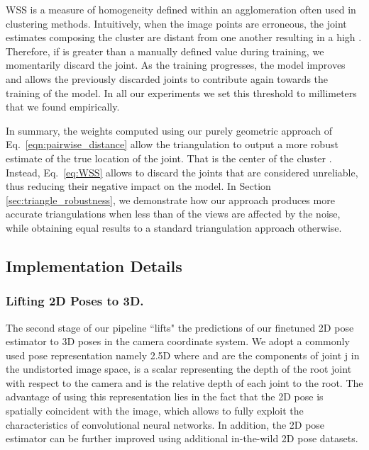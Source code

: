 \documentclass[runningheads]{llncs}
\begin{document}
WSS is a measure of homogeneity defined within an agglomeration often used in clustering methods. Intuitively, when the image points are erroneous, the joint estimates composing the cluster  are distant from one another resulting in a high . Therefore, if  is greater than a manually defined value during training, we momentarily discard the joint. As the training progresses, the model improves and allows the previously discarded joints to contribute again towards the training of the model. In all our experiments we set this threshold to  millimeters that we found empirically.


In summary, the weights computed using our purely geometric approach of Eq.~\ref{eqn:pairwise_distance} allow the triangulation to output a more robust estimate of the true location of the joint. That is the center of the cluster . Instead, Eq.~\ref{eq:WSS} allows to discard the joints that are considered unreliable, thus reducing their negative impact on the model. In Section \ref{sec:triangle_robustness}, we demonstrate how our approach produces more accurate triangulations when less than  of the views are affected by the noise, while obtaining equal results to a standard triangulation approach otherwise.




\subsection{Implementation Details}

\subsubsection*{Lifting 2D Poses to 3D.}

The second stage of our pipeline ``lifts" the predictions of our finetuned 2D pose estimator to 3D poses in the camera coordinate system. We adopt a commonly used pose representation \cite{Sun18d, Pavlakos18a, Iqbal18,Iqbal20} namely 2.5D  where  and  are the components of joint j in the undistorted image space,  is a scalar representing the depth of the root joint with respect to the camera and  is the relative depth of each joint to the root. The advantage of using this representation lies in the fact that the 2D pose  is spatially coincident with the image, which allows to fully exploit the characteristics of convolutional neural networks. In addition, the 2D pose estimator can be further improved using additional in-the-wild 2D pose datasets.
\end{document}
